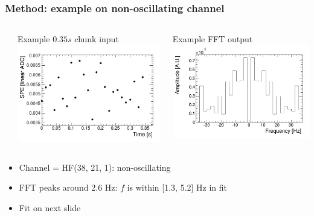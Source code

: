 \documentclass[bigger]{beamer}
\begin{document}
\begin{frame}
\frametitle{Method: example on non-oscillating channel}
\label{sec-2-1-7}
\begin{columns} %
\label{sec-2-1-7-1}
\begin{column}{0.55\textwidth}
\label{sec-2-1-7-1-1}

\centering
Example $0.35 s$ chunk input
\includegraphics[width=.9\linewidth]{fig/input_graph_ieta38_iphi21_depth1.png}
\end{column}
\begin{column}{0.55\textwidth}
\label{sec-2-1-7-1-2}

\centering
Example FFT output
\includegraphics[width=.9\linewidth]{fig/fft_output_ieta38_iphi21_depth1.png}
\end{column}
\end{columns}
\begin{itemize}

\item Channel = HF(38, 21, 1): non-oscillating
\label{sec-2-1-7-2}%

\item FFT peaks around 2.6 Hz: $f$ is within [1.3, 5.2] Hz in fit
\label{sec-2-1-7-3}%

\item Fit on next slide
\label{sec-2-1-7-4}%
\end{itemize} %
\end{frame}
\end{document}
